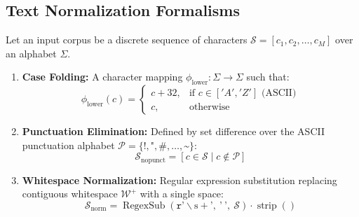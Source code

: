 \documentclass[12pt,a4paper]{report}
\begin{document}
\subsection{Text Normalization Formalisms}
Let an input corpus be a discrete sequence of characters $\mathcal{S} = [c_1, c_2, \dots, c_M]$ over an alphabet $\Sigma$.
\begin{enumerate}
    \item \textbf{Case Folding:} A character mapping $\phi_{\text{lower}}: \Sigma \to \Sigma$ such that:
    \begin{equation}
        \phi_{\text{lower}}(c) = \begin{cases} c + 32, & \text{if } c \in ['A', 'Z'] \text{ (ASCII)} \\ c, & \text{otherwise} \end{cases}
    \end{equation}
    \item \textbf{Punctuation Elimination:} Defined by set difference over the ASCII punctuation alphabet $\mathcal{P} = \{\texttt{!}, \texttt{"}, \texttt{\#}, \dots, \texttt{\textasciitilde}\}$:
    \begin{equation}
        \mathcal{S}_{\text{nopunct}} = [c \in \mathcal{S} \mid c \notin \mathcal{P}]
    \end{equation}
    \item \textbf{Whitespace Normalization:} Regular expression substitution replacing contiguous whitespace $\mathcal{W}^+$ with a single space:
    \begin{equation}
        \mathcal{S}_{\text{norm}} = \operatorname{RegexSub}(\texttt{r}\text{'}\backslash\text{s}+\text{'},\ \text{'}\ \text{'},\ \mathcal{S})\cdot\operatorname{strip}()
    \end{equation}
\end{enumerate}
\end{document}
